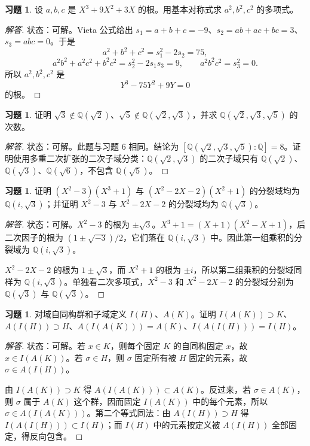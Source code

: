 \documentclass[11pt,a4paper,openany]{ctexbook}
\numberwithin{equation}{chapter}
\newcommand{\Q}{\mathbb{Q}}
\theoremstyle{plain}
\theoremstyle{definition}
\newtheorem{exercise}[theorem]{习题}
\theoremstyle{remark}
\begin{document}
\begin{exercise}
设 $a,b,c$ 是 $X^3+9X^2+3X$ 的根。用基本对称式求 $a^2,b^2,c^2$ 的多项式。
\end{exercise}
\begin{proof}[解答]
状态：可解。Vieta 公式给出 $s_1=a+b+c=-9$、$s_2=ab+ac+bc=3$、$s_3=abc=0$。于是
\[
a^2+b^2+c^2=s_1^2-2s_2=75,
\]
\[
a^2b^2+a^2c^2+b^2c^2=s_2^2-2s_1s_3=9,\qquad a^2b^2c^2=s_3^2=0.
\]
所以 $a^2,b^2,c^2$ 是
\[
Y^3-75Y^2+9Y=0
\]
的根。
\end{proof}

\begin{exercise}
证明 $\sqrt3\notin\Q(\sqrt2)$、$\sqrt5\notin\Q(\sqrt2,\sqrt3)$，并求 $\Q(\sqrt2,\sqrt3,\sqrt5)$ 的次数。
\end{exercise}
\begin{proof}[解答]
状态：可解。此题与习题 6 相同。结论为 $[\Q(\sqrt2,\sqrt3,\sqrt5):\Q]=8$。证明使用多重二次扩张的二次子域分类：$\Q(\sqrt2,\sqrt3)$ 的二次子域只有 $\Q(\sqrt2)$、$\Q(\sqrt3)$、$\Q(\sqrt6)$，不包含 $\Q(\sqrt5)$。
\end{proof}

\begin{exercise}
证明 $(X^2-3)(X^3+1)$ 与 $(X^2-2X-2)(X^2+1)$ 的分裂域均为 $\Q(i,\sqrt3)$；并证明 $X^2-3$ 与 $X^2-2X-2$ 的分裂域均为 $\Q(\sqrt3)$。
\end{exercise}
\begin{proof}[解答]
状态：可解。$X^2-3$ 的根为 $\pm\sqrt3$。$X^3+1=(X+1)(X^2-X+1)$，后二次因子的根为 $(1\pm\sqrt{-3})/2$，它们落在 $\Q(i,\sqrt3)$ 中。因此第一组乘积的分裂域为 $\Q(i,\sqrt3)$。

$X^2-2X-2$ 的根为 $1\pm\sqrt3$，而 $X^2+1$ 的根为 $\pm i$，所以第二组乘积的分裂域同样为 $\Q(i,\sqrt3)$。单独看二次多项式，$X^2-3$ 和 $X^2-2X-2$ 的分裂域分别为 $\Q(\sqrt3)$ 与 $\Q(\sqrt3)$。
\end{proof}

\begin{exercise}
对域自同构群和子域定义 $I(H)$、$A(K)$。证明 $I(A(K))\supset K$、$A(I(H))\supset H$、$A(I(A(K)))=A(K)$、$I(A(I(H)))=I(H)$。
\end{exercise}
\begin{proof}[解答]
状态：可解。若 $x\in K$，则每个固定 $K$ 的自同构固定 $x$，故 $x\in I(A(K))$。若 $\sigma\in H$，则 $\sigma$ 固定所有被 $H$ 固定的元素，故 $\sigma\in A(I(H))$。

由 $I(A(K))\supset K$ 得 $A(I(A(K)))\subset A(K)$。反过来，若 $\sigma\in A(K)$，则 $\sigma$ 属于 $A(K)$ 这个群，因而固定 $I(A(K))$ 中的每个元素，所以 $\sigma\in A(I(A(K)))$。第二个等式同法：由 $A(I(H))\supset H$ 得 $I(A(I(H)))\subset I(H)$；而 $I(H)$ 中的元素按定义被 $A(I(H))$ 全部固定，得反向包含。
\end{proof}
\end{document}
